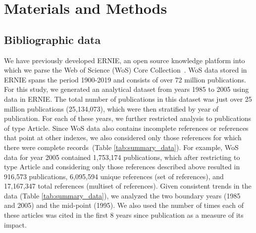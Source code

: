 \documentclass[NETN]{stjour}
\begin{document}
\section{Materials and Methods}

\subsection{Bibliographic data} We have previously developed ERNIE, an open source knowledge platform into which we parse the Web of Science (WoS) Core Collection~\citep{Keserci371955}. WoS data stored in ERNIE spans the period 1900-2019 and consists of over 72 million publications. For this study, we generated an analytical dataset from years 1985 to 2005 using data in ERNIE. The total number of publications in this dataset was just over 25 million publications (25,134,073), which were then stratified by year of publication. For each of these years, we further restricted analysis to publications of type Article. Since WoS data also contains incomplete references or references that point at other indexes, we also considered only those references for which there were complete records~(Table \ref{tab:summary_data}). For example, WoS data for year 2005 contained 1,753,174 publications, which after restricting to type Article and considering only those references described above resulted in 916,573 publications, 6,095,594 unique references (set of references), and 17,167,347 total references (multiset of references). Given consistent trends in the data (Table \ref{tab:summary_data}), we analyzed the two boundary years (1985 and 2005) and the mid-point (1995). We also used the number of times each of these articles was cited in the first 8 years since publication as a measure of its impact.
\vspace{-4mm}
\end{document}
